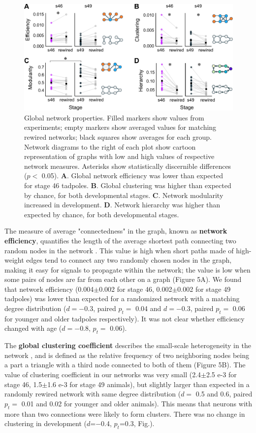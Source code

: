 \documentclass{article}
\begin{document}
\begin{figure}[t!]
\includegraphics[width=\linewidth]{fig5.pdf}
\caption{
Global network properties. Filled markers show values from experiments; empty markers show averaged values for matching rewired networks; black squares show averages for each group. Network diagrams to the right of each plot show cartoon representation of graphs with low and high values of respective network measures. Asterisks show statistically discernible differences ($p<$ 0.05). \textbf{A}. Global network efficiency was lower than expected for stage 46 tadpoles. \textbf{B}. Global clustering was higher than expected by chance, for both developmental stages. \textbf{C}. Network modularity increased in development.  \textbf{D}. Network hierarchy was higher than expected by chance, for both developmental stages. }
\end{figure}

The measure of average "connectedness" in the graph, known as \textbf{network efficiency}, quantifies the length of the average shortest path connecting two random nodes in the network \citep{latora2001efficiency, rubinov2010toolbox}. This value is high when short paths made of high-weight edges tend to connect any two randomly chosen nodes in the graph, making it easy for signals to propagate within the network; the value is low when some pairs of nodes are far from each other on a graph (Figure 5A). We found that network efficiency (0.004$\pm$0.002 for stage 46, 0.002$\pm$0.002 for stage 49 tadpoles) was lower than expected for a randomized network with a matching degree distribution ($d=-$0.3, paired $p_t=$ 0.04 and $d=-$0.3, paired $p_t=$ 0.06 for younger and older tadpoles respectively). It was not clear whether efficiency changed with age ($d=-$0.8, $p_t=$ 0.06).

The \textbf{global clustering coefficient} describes the small-scale heterogeneity in the network \citep{fagiolo2007}, and is defined as the relative frequency of two neighboring nodes being a part a triangle with a third node connected to both of them (Figure 5B). The value of clustering coefficient in our networks was very small (2.4$\pm$2.5 e-3 for stage 46, 1.5$\pm$1.6 e-3 for stage 49 animals), but slightly larger than expected in a randomly rewired network with same degree distribution ($d=$ 0.5 and 0.6, paired $p_t=$ 0.01 and 0.02 for younger and older animals). This means that neurons with more than two connections were likely to form clusters. There was no change in clustering in development ($d$=$-$0.4, $p_t$=0.3, Fig.).
\end{document}
